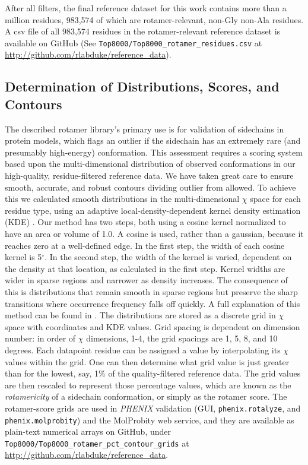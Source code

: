 After all filters, the final reference dataset for this work contains more than a million residues, 983,574 of which are rotamer-relevant, non-Gly non-Ala residues. A csv file of all 983,574 residues in the rotamer-relevant reference dataset is available on GitHub (See \texttt{Top8000/Top8000\_rotamer\_residues.csv} at \url{http://github.com/rlabduke/reference_data}).

\subsection{Determination of Distributions, Scores, and Contours}
\label{sec_md:contours}
The described rotamer library's primary use is for validation of sidechains in protein models, which flags an outlier if the sidechain has an extremely rare (and presumably high-energy) conformation. This assessment requires a scoring system based upon the multi-dimensional distribution of observed conformations in our high-quality, residue-filtered reference data. We have taken great care to ensure smooth, accurate, and robust contours dividing outlier from allowed. To achieve this we calculated smooth distributions in the multi-dimensional $\chi$ space for each residue type, using an adaptive local-density-dependent kernel density estimation (KDE) \textcolor{changecolor}{\cite{Breiman1977}}. Our method has two steps, both using a cosine kernel normalized to have an area or volume of 1.0. A cosine is used, rather than a gaussian, because it reaches zero at a well-defined edge. In the first step, the width of each cosine kernel is 5$^{\circ}$. In the second step, the width of the kernel is varied, dependent on the density at that location, as calculated in the first step. Kernel widths are wider in sparse regions and narrower as density increases. The consequence of this is distributions that remain smooth in sparse regions but preserve the sharp transitions where occurrence frequency falls off quickly. A full explanation of this method can be found in \cite{Lovell:2003uq}. The distributions are stored as a discrete grid in $\chi$ space with coordinates and KDE values. Grid spacing is dependent on dimension number: in order of $\chi$ dimensions, 1-4, the grid spacings are 1, 5, 8, and 10 degrees. Each datapoint residue can be assigned a value by interpolating its $\chi$ values within the grid. One can then determine what grid value is just greater than for the lowest, say, 1\% of the quality-filtered reference data. The grid values are then rescaled to represent those percentage values, which are known as the \textit{rotamericity} of a sidechain conformation, or simply as the rotamer score. The rotamer-score grids are used in \textit{PHENIX} validation (GUI, \texttt{phenix.rotalyze}, and \texttt{phenix.molprobity}) and the MolProbity web service, and they are available as plain-text numerical arrays on GitHub, under \texttt{Top8000/Top8000\_rotamer\_pct\_contour\_grids} at \url{http://github.com/rlabduke/reference_data}.

